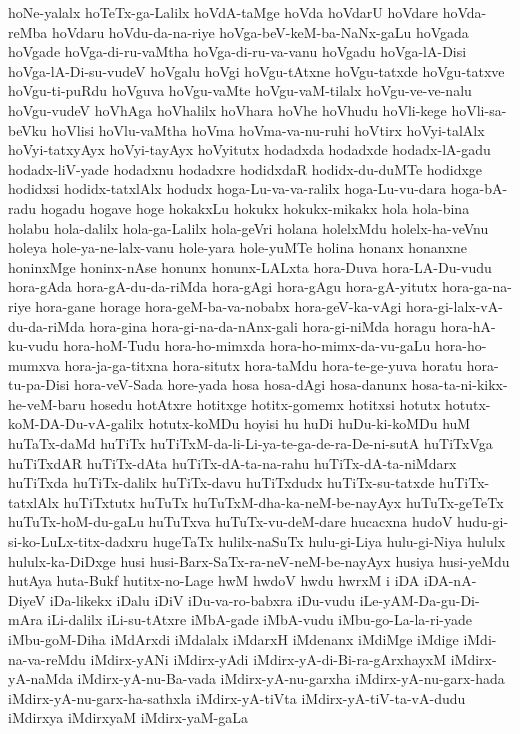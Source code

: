{hoNe-yalalx
hoTeTx-ga-Lalilx
hoVdA-taMge
hoVda
hoVdarU
hoVdare
hoVda-reMba
hoVdaru
hoVdu-da-na-riye
hoVga-beV-keM-ba-NaNx-gaLu
hoVgada
hoVgade
hoVga-di-ru-vaMtha
hoVga-di-ru-va-vanu
hoVgadu
hoVga-lA-Disi
hoVga-lA-Di-su-vudeV
hoVgalu
hoVgi
hoVgu-tAtxne
hoVgu-tatxde
hoVgu-tatxve
hoVgu-ti-puRdu
hoVguva
hoVgu-vaMte
hoVgu-vaM-tilalx
hoVgu-ve-ve-nalu
hoVgu-vudeV
hoVhAga
hoVhalilx
hoVhara
hoVhe
hoVhudu
hoVli-kege
hoVli-sa-beVku
hoVlisi
hoVlu-vaMtha
hoVma
hoVma-va-nu-ruhi
hoVtirx
hoVyi-talAlx
hoVyi-tatxyAyx
hoVyi-tayAyx
hoVyitutx
hodadxda
hodadxde
hodadx-lA-gadu
hodadx-liV-yade
hodadxnu
hodadxre
hodidxdaR
hodidx-du-duMTe
hodidxge
hodidxsi
hodidx-tatxlAlx
hodudx
hoga-Lu-va-va-ralilx
hoga-Lu-vu-dara
hoga-bA-radu
hogadu
hogave
hoge
hokakxLu
hokukx
hokukx-mikakx
hola
hola-bina
holabu
hola-dalilx
hola-ga-Lalilx
hola-geVri
holana
holelxMdu
holelx-ha-veVnu
holeya
hole-ya-ne-lalx-vanu
hole-yara
hole-yuMTe
holina
honanx
honanxne
honinxMge
honinx-nAse
honunx
honunx-LALxta
hora-Duva
hora-LA-Du-vudu
hora-gAda
hora-gA-du-da-riMda
hora-gAgi
hora-gAgu
hora-gA-yitutx
hora-ga-na-riye
hora-gane
horage
hora-geM-ba-va-nobabx
hora-geV-ka-vAgi
hora-gi-lalx-vA-du-da-riMda
hora-gina
hora-gi-na-da-nAnx-gali
hora-gi-niMda
horagu
hora-hA-ku-vudu
hora-hoM-Tudu
hora-ho-mimxda
hora-ho-mimx-da-vu-gaLu
hora-ho-mumxva
hora-ja-ga-titxna
hora-situtx
hora-taMdu
hora-te-ge-yuva
horatu
hora-tu-pa-Disi
hora-veV-Sada
hore-yada
hosa
hosa-dAgi
hosa-danunx
hosa-ta-ni-kikx-he-veM-baru
hosedu
hotAtxre
hotitxge
hotitx-gomemx
hotitxsi
hotutx
hotutx-koM-DA-Du-vA-galilx
hotutx-koMDu
hoyisi
hu
huDi
huDu-ki-koMDu
huM
huTaTx-daMd
huTiTx
huTiTxM-da-li-Li-ya-te-ga-de-ra-De-ni-sutA
huTiTxVga
huTiTxdAR
huTiTx-dAta
huTiTx-dA-ta-na-rahu
huTiTx-dA-ta-niMdarx
huTiTxda
huTiTx-dalilx
huTiTx-davu
huTiTxdudx
huTiTx-su-tatxde
huTiTx-tatxlAlx
huTiTxtutx
huTuTx
huTuTxM-dha-ka-neM-be-nayAyx
huTuTx-geTeTx
huTuTx-hoM-du-gaLu
huTuTxva
huTuTx-vu-deM-dare
hucacxna
hudoV
hudu-gi-si-ko-LuLx-titx-dadxru
hugeTaTx
hulilx-naSuTx
hulu-gi-Liya
hulu-gi-Niya
hululx
hululx-ka-DiDxge
husi
husi-Barx-SaTx-ra-neV-neM-be-nayAyx
husiya
husi-yeMdu
hutAya
huta-Bukf
hutitx-no-Lage
hwM
hwdoV
hwdu
hwrxM
i
iDA
iDA-nA-DiyeV
iDa-likekx
iDalu
iDiV
iDu-va-ro-babxra
iDu-vudu
iLe-yAM-Da-gu-Di-mAra
iLi-dalilx
iLi-su-tAtxre
iMbA-gade
iMbA-vudu
iMbu-go-La-la-ri-yade
iMbu-goM-Diha
iMdArxdi
iMdalalx
iMdarxH
iMdenanx
iMdiMge
iMdige
iMdi-na-va-reMdu
iMdirx-yANi
iMdirx-yAdi
iMdirx-yA-di-Bi-ra-gArxhayxM
iMdirx-yA-naMda
iMdirx-yA-nu-Ba-vada
iMdirx-yA-nu-garxha
iMdirx-yA-nu-garx-hada
iMdirx-yA-nu-garx-ha-sathxla
iMdirx-yA-tiVta
iMdirx-yA-tiV-ta-vA-dudu
iMdirxya
iMdirxyaM
iMdirx-yaM-gaLa
}
